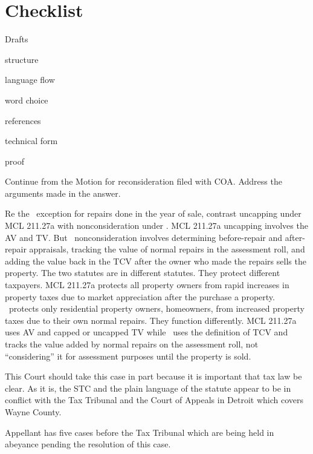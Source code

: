 \documentclass[12pt,\documentclassflag]{michiganCourtOfAppealsBrief}
\begin{document}
\section{Checklist}
\begin{todolist}
\item Drafts
  \begin{todolist}
  \item structure
  \item language flow
  \item word choice
  \item references
  \item technical form
  \item proof
  \end{todolist}

\item Continue from the Motion for reconsideration filed with COA. Address the arguments made in the answer.

  Re the \mathieuGast\ exception for repairs done in the year of sale, contrast uncapping under MCL 211.27a with nonconsideration under \mathieuGast. MCL 211.27a uncapping involves the AV and TV. But \mathieuGast\ nonconsideration involves determining before-repair and after-repair appraisals, tracking the value of normal repairs in the assessment roll, and adding the value back in the TCV after the owner who made the repairs sells the property.
  The two statutes are in different statutes. They protect different taxpayers. MCL 211.27a protects all property owners from rapid increases in property taxes due to market appreciation after the purchase a property. \mathieuGast\ protects only residential property owners, homeowners, from increased property taxes due to their own normal repairs. They function differently. MCL 211.27a uses AV and capped or uncapped TV while \mathieuGast\ uses the definition of TCV and tracks the value added by normal repairs on the assessment roll, not ``considering'' it for assessment purposes until the property is sold.

  

  This Court should take this case in part because it is important that tax law be clear. As it is, the STC and the plain language of the statute appear to be in conflict with the Tax Tribunal and the Court of Appeals in Detroit which covers Wayne County.

  Appellant has five cases before the Tax Tribunal which are being held in abeyance pending the resolution of this case.


\end{todolist}
\end{document}
